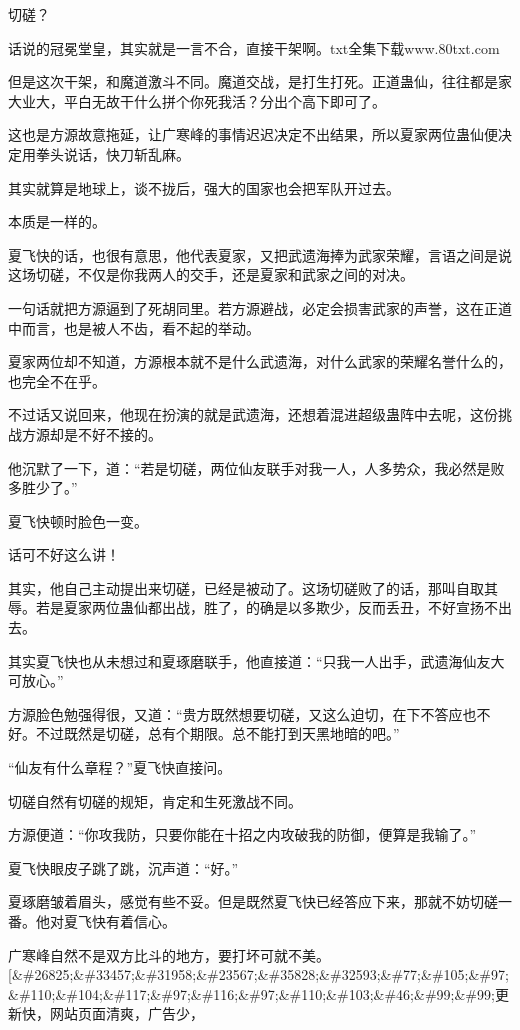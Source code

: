 
\begin{this_body}

切磋？

话说的冠冕堂皇，其实就是一言不合，直接干架啊。txt全集下载www.80txt.com

但是这次干架，和魔道激斗不同。魔道交战，是打生打死。正道蛊仙，往往都是家大业大，平白无故干什么拼个你死我活？分出个高下即可了。

这也是方源故意拖延，让广寒峰的事情迟迟决定不出结果，所以夏家两位蛊仙便决定用拳头说话，快刀斩乱麻。

其实就算是地球上，谈不拢后，强大的国家也会把军队开过去。

本质是一样的。

夏飞快的话，也很有意思，他代表夏家，又把武遗海捧为武家荣耀，言语之间是说这场切磋，不仅是你我两人的交手，还是夏家和武家之间的对决。

一句话就把方源逼到了死胡同里。若方源避战，必定会损害武家的声誉，这在正道中而言，也是被人不齿，看不起的举动。

夏家两位却不知道，方源根本就不是什么武遗海，对什么武家的荣耀名誉什么的，也完全不在乎。

不过话又说回来，他现在扮演的就是武遗海，还想着混进超级蛊阵中去呢，这份挑战方源却是不好不接的。

他沉默了一下，道：“若是切磋，两位仙友联手对我一人，人多势众，我必然是败多胜少了。”

夏飞快顿时脸色一变。

话可不好这么讲！

其实，他自己主动提出来切磋，已经是被动了。这场切磋败了的话，那叫自取其辱。若是夏家两位蛊仙都出战，胜了，的确是以多欺少，反而丢丑，不好宣扬不出去。

其实夏飞快也从未想过和夏琢磨联手，他直接道：“只我一人出手，武遗海仙友大可放心。”

方源脸色勉强得很，又道：“贵方既然想要切磋，又这么迫切，在下不答应也不好。不过既然是切磋，总有个期限。总不能打到天黑地暗的吧。”

“仙友有什么章程？”夏飞快直接问。

切磋自然有切磋的规矩，肯定和生死激战不同。

方源便道：“你攻我防，只要你能在十招之内攻破我的防御，便算是我输了。”

夏飞快眼皮子跳了跳，沉声道：“好。”

夏琢磨皱着眉头，感觉有些不妥。但是既然夏飞快已经答应下来，那就不妨切磋一番。他对夏飞快有着信心。

广寒峰自然不是双方比斗的地方，要打坏可就不美。[\&\#26825;\&\#33457;\&\#31958;\&\#23567;\&\#35828;\&\#32593;\&\#77;\&\#105;\&\#97;\&\#110;\&\#104;\&\#117;\&\#97;\&\#116;\&\#97;\&\#110;\&\#103;\&\#46;\&\#99;\&\#99;更新快，网站页面清爽，广告少，


\end{this_body}
